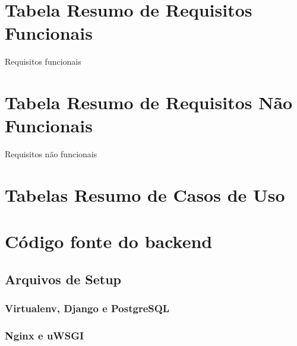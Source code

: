 \chapter{Tabela Resumo de Requisitos Funcionais}
   \begin{table}[H]
        \centering
        \caption{Requisitos funcionais}
        \label{tab:reqFunc}
        \PrintRequisitosFunc
    \end{table}

\chapter{Tabela Resumo de Requisitos Não Funcionais}
   \begin{table}[H]
        \centering
        \caption{Requisitos não funcionais}
        \label{tab:reqNFunc}
        \PrintRequisitosNFunc
    \end{table}
    
\chapter{Tabelas Resumo de Casos de Uso}


\chapter{Código fonte do backend}\label{anexos:sources}
\let\svaddcontentsline\addcontentsline
\renewcommand\addcontentsline[3]{%
  \ifthenelse{\equal{#1}{lol}}{}%
  {\svaddcontentsline{#1}{#2}{#3}}}
%
\section{Arquivos de Setup}
\subsection{Virtualenv, Django e PostgreSQL}

\clearpage
\subsection{Nginx e uWSGI}




\clearpage
